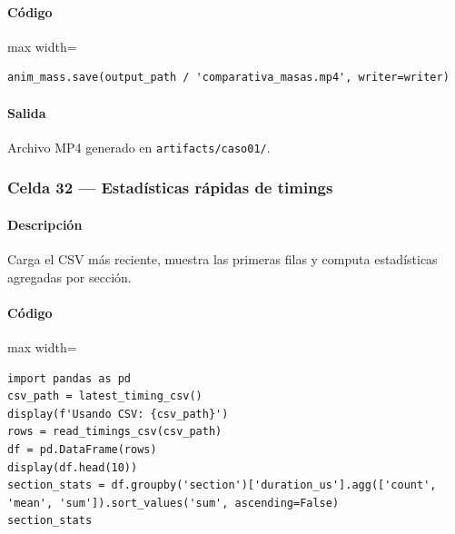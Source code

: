 \paragraph{Código}
\begin{listing}[H]
\caption{Celda 31: exportación de \texttt{comparativa\_masas.mp4}}
\begin{adjustbox}{max width=\textwidth}
\begin{minipage}{\textwidth}
\begin{verbatim}
anim_mass.save(output_path / 'comparativa_masas.mp4', writer=writer)
\end{verbatim}
\end{minipage}
\end{adjustbox}
\end{listing}
\paragraph{Salida} Archivo MP4 generado en \texttt{artifacts/caso01/}.

\subsubsection*{Celda 32 — Estadísticas rápidas de timings}
\paragraph{Descripción} Carga el CSV más reciente, muestra las primeras filas y computa estadísticas agregadas por sección.
\paragraph{Código}
\begin{listing}[H]
\caption{Celda 32: inspección de timings}
\begin{adjustbox}{max width=\textwidth}
\begin{minipage}{\textwidth}
\begin{verbatim}
import pandas as pd
csv_path = latest_timing_csv()
display(f'Usando CSV: {csv_path}')
rows = read_timings_csv(csv_path)
df = pd.DataFrame(rows)
display(df.head(10))
section_stats = df.groupby('section')['duration_us'].agg(['count', 'mean', 'sum']).sort_values('sum', ascending=False)
section_stats
\end{verbatim}
\end{minipage}
\end{adjustbox}
\end{listing}
